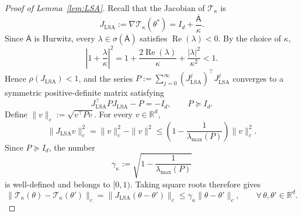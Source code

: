 \documentclass[10pt,a4paper]{amsart}
\newcommand{\R}{\mathbb{R}}
\newcommand{\mT}{\mathcal{T}}
\begin{document}
\begin{proof}[Proof of Lemma~\ref{lem:LSA}]
Recall that the Jacobian of \(\mT_\kappa\) is
\[
    J_{\mathrm{LSA}}
    :=\nabla\mT_\kappa(\theta^*)
    =I_d+\frac{\overline{\mathsf A}}{\kappa}.
\]
Since $\overline{\mathsf A}$ is Hurwitz,
every $\lambda\in\sigma(\overline{\mathsf A})$ satisfies
$\operatorname{Re}(\lambda)<0$. By the choice of $\kappa$,
\[
    \left|1+\frac{\lambda}{\kappa}\right|^2
    =1+\frac{2\operatorname{Re}(\lambda)}{\kappa}
      +\frac{|\lambda|^2}{\kappa^2}
    <1.
\]
Hence $\rho(J_{\mathrm{LSA}})<1$, and the series $P:=\sum_{j=0}^{\infty}(J_{\mathrm{LSA}}^j)^\top J_{\mathrm{LSA}}^j$ converges to a symmetric positive-definite matrix satisfying
\[
    J_{\mathrm{LSA}}^\top P J_{\mathrm{LSA}}-P=-I_d,
    \qquad P\succeq I_d.
\]
Define $\|v\|_c:=\sqrt{v^\top Pv}$. For every $v\in\R^d$,
\[
    \|J_{\mathrm{LSA}} v\|_c^2
    =\|v\|_c^2-\|v\|^2
    \leq
    \left(1-\frac{1}{\lambda_{\max}(P)}\right)\|v\|_c^2.
\]
Since $P\succeq I_d$, the number
\[
    \gamma_\kappa
    :=\sqrt{1-\frac{1}{\lambda_{\max}(P)}}
\]
is well-defined and belongs to $[0,1)$. Taking square roots therefore
gives
\[
    \|\mT_\kappa(\theta)-\mT_\kappa(\theta')\|_c
    =\|J_{\mathrm{LSA}}(\theta-\theta')\|_c
    \leq\gamma_\kappa\|\theta-\theta'\|_c,
    \qquad \forall\,\theta,\theta'\in\R^d.
\]
\end{proof}
\end{document}
